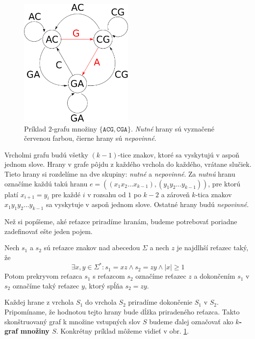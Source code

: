 \begin{figure}

\centerline{\includegraphics[width=0.5\textwidth]{images/graph-2-1-3.pdf}}

\caption[Príklad grafu]{Príklad $2$-grafu množiny $\{\texttt{ACG}, \texttt{CGA} \}$. \emph{Nutné} hrany sú vyznačené
červenou farbou, čierne hrany sú \emph{nepovinné}.}

\label{obr:graf}

\end{figure}

Vrcholmi grafu budú všetky $(k-1)$-tice znakov, ktoré sa vyskytujú v aspoň jednom slove. Hrany
v grafe pôjdu z každého vrchola do každého, vrátane slučiek. Tieto hrany si rozdelíme na dve
skupiny: \emph{nutné} a \emph{nepovinné}. Za \emph{nutnú} hranu označíme každú takú hranu
$e = ( (x_1 x_2 \ldots x_{k-1}), (y_1 y_2 \ldots y_{k-1}))$, pre ktorú platí $x_{i+1} = y_{i}$ pre
každé $i$ v rozsahu od $1$ po $k - 2$ a zároveň $k$-tica znakov $x_1 y_1 y_2 \ldots y_{k-1}$ sa
vyskytuje v aspoň jednom slove. Ostatné hrany budú \emph{nepovinné}.

Než si popíšeme, aké reťazce priradíme hranám, budeme potrebovať poriadne zadefinovať
ešte jeden pojem.

\begin{defn}
Nech $s_1$ a $s_2$ sú reťazce znakov nad abecedou $\Sigma$ a nech $z$ je najdlhší reťazec taký, že
$$\exists x, y \in \Sigma^*: s_1 = xz \wedge s_2 = zy \wedge |x| \ge 1 $$
Potom prekryvom reťazca $s_1$ s reťazcom $s_2$ označíme reťazec $z$ a dokončením $s_1$ v $s_2$ označíme
taký reťazec $y$, ktorý spĺňa $s_2 = zy$.
\end{defn}

Každej hrane z vrchola $S_1$ do vrchola $S_2$ priradíme dokončenie $S_1$ v
$S_2$. Pripomíname, že hodnotou tejto hrany bude dĺžka priradeného reťazca.
Takto skonštruovaný graf k množine vstupných slov $S$ budeme ďalej označovať ako
\textbf{\boldmath$k$-graf množiny \boldmath$S$}. Konkrétny príklad môžeme vidieť
v obr. \ref{obr:graf}.

